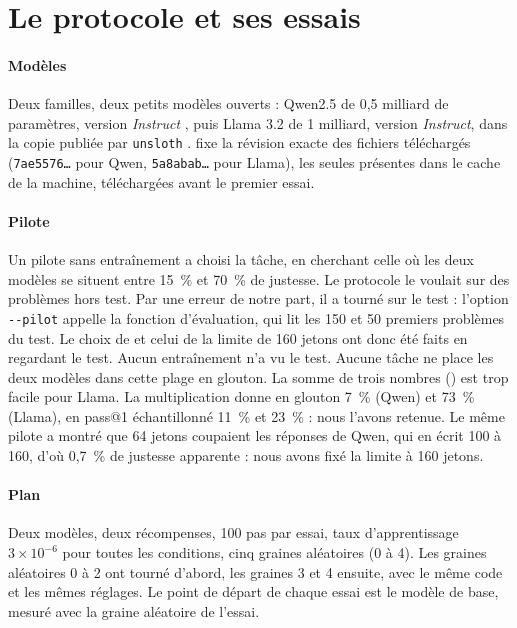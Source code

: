 \section{Le protocole et ses essais}
\label{sec:llm-protocole}

\paragraph{Modèles} Deux familles, deux petits modèles ouverts : Qwen2.5 de 0,5 milliard de
paramètres, version \emph{Instruct} \parencite{qwen2025qwen25}, puis Llama 3.2 de 1 milliard,
version \emph{Instruct}, dans la copie publiée par \texttt{unsloth}
\parencite{meta2024llama32,grattafiori2024llama3}.  fixe la
révision exacte des fichiers téléchargés (\texttt{7ae5576\dots} pour Qwen, \texttt{5a8abab\dots}
pour Llama), les seules présentes dans le cache de la machine, téléchargées
avant le premier essai.

\paragraph{Pilote} Un pilote sans entraînement a choisi la tâche, en cherchant celle où les deux modèles se
situent entre 15~\% et 70~\% de justesse. Le protocole le voulait sur des problèmes hors test. Par une erreur
de notre part, il a tourné sur le test : l'option \texttt{-{}-pilot} appelle la fonction d'évaluation, qui lit les 150 et 50
premiers problèmes du test. Le choix de  et celui de la limite de 160 jetons ont donc été faits en
regardant le test. Aucun entraînement n'a vu le test. Aucune tâche ne place les deux
modèles dans cette plage en glouton. La somme de trois nombres () est trop facile pour
Llama. La multiplication  donne en glouton 7~\% (Qwen) et 73~\% (Llama), en pass@1
échantillonné 11~\% et 23~\% : nous l'avons retenue. Le même pilote a montré que 64 jetons coupaient les
réponses de Qwen, qui en écrit 100 à 160, d'où 0,7~\% de justesse apparente : nous avons fixé la limite à
160 jetons.

\paragraph{Plan} Deux modèles, deux récompenses, 100 pas par essai, taux d'apprentissage $3 \times
10^{-6}$ pour toutes les conditions, cinq graines aléatoires (0 à 4). Les graines aléatoires 0 à 2 ont
tourné d'abord, les graines 3 et 4 ensuite, avec le même code et les mêmes réglages. Le point de départ de chaque essai est
le modèle de base, mesuré avec la graine aléatoire de l'essai.

